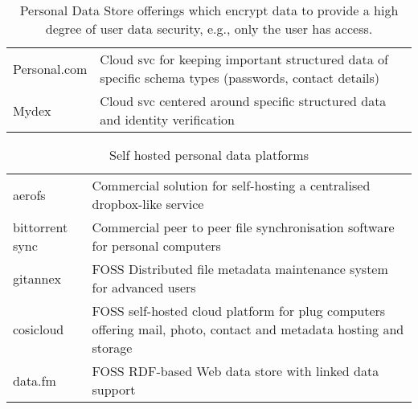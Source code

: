 \documentclass[runningheads,a4paper]{llncs}
\begin{document}
\begin{table}
\begin{tabular}{l p{8.5cm}}
Personal.com & Cloud svc for keeping important structured data of specific schema types (passwords, contact details)  \\
Mydex & Cloud svc centered around specific structured data and identity verification  \\
\end{tabular}
\caption{Personal Data Store offerings which encrypt data to provide a high degree of user data security, e.g., only the user has access.}
\label{fig:pdsofferingsp}
\end{table}

\begin{table}
\begin{tabular}{l p{9cm} }
aerofs & Commercial solution for self-hosting a centralised dropbox-like service \\
bittorrent sync & Commercial peer to peer file synchronisation software for personal computers \\
gitannex &  FOSS Distributed file metadata maintenance system for advanced users \\ 
cosicloud & FOSS self-hosted cloud platform for plug computers offering mail, photo, contact and metadata hosting and storage \\
data.fm & FOSS RDF-based Web data store with linked data support
\end{tabular}
\caption{Self hosted personal data platforms}
\label{fig:selfhosted}
\end{table}



\end{document}
